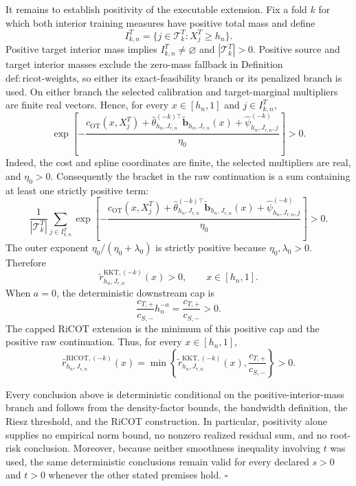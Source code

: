 It remains to establish positivity of the executable extension.  Fix a fold \(k\) for
which both interior training measures have positive total mass and define
\[
 I^T_{k,n}=\{j\in\mathcal T^T_k:X_j^T\ge h_n\}.
\]
Positive target interior mass implies \(I^T_{k,n}\ne\varnothing\) and
\(|\mathcal T^T_k|>0\).  Positive source and target interior masses exclude the
zero-mass fallback in Definition \(\mathrm{def:ricot\text{-}weights}\), so either its
exact-feasibility branch or its penalized branch is used.  On either branch the
selected calibration and target-marginal multipliers are finite real vectors.  Hence,
for every \(x\in[h_n,1]\) and \(j\in I^T_{k,n}\),
\[
 \exp\!\left[-\frac{c_{\mathrm{OT}}(x,X_j^T)
 +\widehat\theta_{h_n,J_{r,n}}^{(-k)\top}
   \widetilde{\mathbf b}_{h_n,J_{r,n}}(x)
 +\widehat\psi^{(-k)}_{h_n,J_{r,n},j}}{\eta_0}\right]>0.
\]
Indeed, the cost and spline coordinates are finite, the selected multipliers are real,
and \(\eta_0>0\).  Consequently the bracket in the raw continuation is a sum containing
at least one strictly positive term:
\[
 \frac{1}{|\mathcal T^T_k|}
 \sum_{j\in I^T_{k,n}}
 \exp\!\left[-\frac{c_{\mathrm{OT}}(x,X_j^T)
 +\widehat\theta_{h_n,J_{r,n}}^{(-k)\top}
   \widetilde{\mathbf b}_{h_n,J_{r,n}}(x)
 +\widehat\psi^{(-k)}_{h_n,J_{r,n},j}}{\eta_0}\right]>0.
\]
The outer exponent \(\eta_0/(\eta_0+\lambda_0)\) is strictly positive because
\(\eta_0,\lambda_0>0\).  Therefore
\[
 \widetilde r^{\mathrm{KKT},(-k)}_{h_n,J_{r,n}}(x)>0,
 \qquad x\in[h_n,1].
\]
When \(a=0\), the deterministic downstream cap is
\[
 \frac{c_{T,+}}{c_{S,-}}h_n^{-a}=\frac{c_{T,+}}{c_{S,-}}>0.
\]
The capped RiCOT extension is the minimum of this positive cap and the positive raw
continuation.  Thus, for every \(x\in[h_n,1]\),
\[
 \widehat r^{\mathrm{RICOT},(-k)}_{h_n,J_{r,n}}(x)
 =\min\!\left\{
 \widetilde r^{\mathrm{KKT},(-k)}_{h_n,J_{r,n}}(x),
 \frac{c_{T,+}}{c_{S,-}}
 \right\}>0.
\]

Every conclusion above is deterministic conditional on the positive-interior-mass
branch and follows from the density-factor bounds, the bandwidth definition, the Riesz
threshold, and the RiCOT construction.  In particular, positivity alone supplies no
empirical norm bound, no nonzero realized residual sum, and no root-risk conclusion.
Moreover, because neither smoothness inequality involving \(t\) was used, the same
deterministic conclusions remain valid for every declared \(s>0\) and \(t>0\) whenever
the other stated premises hold. \(\square\)